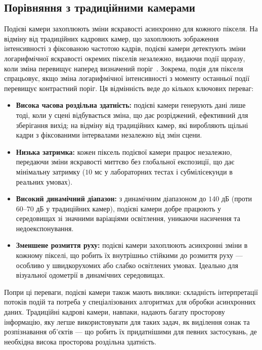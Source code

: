 \subsection{Порівняння з традиційними камерами}
Подієві камери захоплюють зміни яскравості асинхронно для кожного пікселя. На відміну від традиційних кадрових камер, що захоплюють зображення інтенсивності з фіксованою частотою кадрів, подієві камери детектують зміни логарифмічної яскравості окремих пікселів незалежно, видаючи події щоразу, коли зміна перевищує наперед визначений поріг~\cite{shariff2024event}. Зокрема, подія для пікселя спрацьовує, якщо зміна логарифмічної інтенсивності з моменту останньої події перевищує контрастний поріг. Ця відмінність веде до кількох ключових переваг:
\begin{itemize}[label= {}, left=5pt]
    \renewcommand{\labelitemi}{$\ast$}
    \item \textbf{Висока часова роздільна здатність:} подієві камери генерують дані лише тоді, коли у сцені відбувається зміна, що дає розріджений, ефективний для зберігання вихід; на відміну від традиційних камер, які виробляють щільні кадри з фіксованими інтервалами незалежно від змін сцени.
    \item \textbf{Низька затримка:} кожен піксель подієвої камери працює незалежно, передаючи зміни яскравості миттєво без глобальної експозиції, що дає мінімальну затримку (\(10\) мс у лабораторних тестах і субмілісекунди в реальних умовах).
    \item \textbf{Високий динамічний діапазон:} з динамічним діапазоном до \(140\) дБ (проти \(60\)--\(70\) дБ у традиційних камер), подієві камери добре працюють у середовищах зі значними варіаціями освітлення, уникаючи насичення та недоекспонування.
    \item \textbf{Зменшене розмиття руху:} подієві камери захоплюють асинхронні зміни в кожному пікселі, що робить їх внутрішньо стійкими до розмиття руху — особливо у швидкорухомих або слабко освітлених умовах. Ідеально для візуальної одометрії в динамічних середовищах.
\end{itemize}

Попри ці переваги, подієві камери також мають виклики: складність інтерпретації потоків подій та потреба у спеціалізованих алгоритмах для обробки асинхронних даних. Традиційні кадрові камери, навпаки, надають багату просторову інформацію, яку легше використовувати для таких задач, як виділення ознак та розпізнавання об'єктів — що робить їх придатнішими для певних застосувань, де необхідна висока просторова роздільна здатність.

